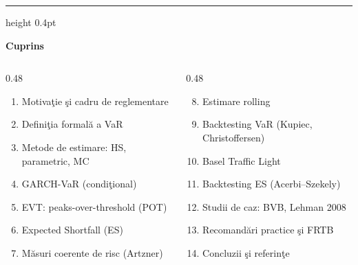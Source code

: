\documentclass[9pt, aspectratio=169, t]{beamer}
\theoremstyle{definition}
\begin{document}
{
\begin{frame}{}
    {\color{FooterGray}\hrule height 0.4pt}
    \vspace{0.1cm}
    {\Large\textcolor{IDAred}{\textbf{Cuprins}}}
    \vspace{0.2cm}
    {\small
    \begin{columns}[T]
        \begin{column}{0.48\textwidth}
            \begin{enumerate}
                \item Motiva\c tie \c si cadru de reglementare
                \item Defini\c tia formal\u a a VaR
                \item Metode de estimare: HS, parametric, MC
                \item GARCH-VaR (condi\c tional)
                \item EVT: peaks-over-threshold (POT)
                \item Expected Shortfall (ES)
                \item M\u asuri coerente de risc (Artzner)
            \end{enumerate}
        \end{column}
        \begin{column}{0.48\textwidth}
            \begin{enumerate}\setcounter{enumi}{7}
                \item Estimare rolling
                \item Backtesting VaR (Kupiec, Christoffersen)
                \item Basel Traffic Light
                \item Backtesting ES (Acerbi--Szekely)
                \item Studii de caz: BVB, Lehman 2008
                \item Recomand\u ari practice \c si FRTB
                \item Concluzii \c si referin\c te
            \end{enumerate}
        \end{column}
    \end{columns}
    }
\end{frame}
}
\end{document}
